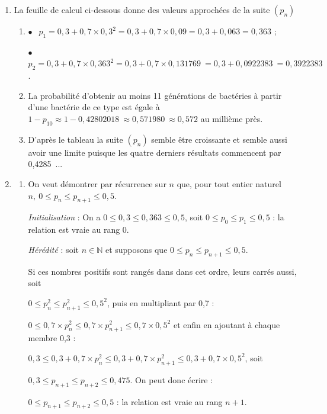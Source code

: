 \documentclass[10pt]{article}
\providecommand{\N}{\mathbb{N}}
\providecommand{\np}[2][]{{#2~#1}}
\begin{document}
\begin{enumerate}
\item La feuille de calcul ci-dessous donne des valeurs approchées de la suite $\left(p_n\right)$
	\begin{enumerate}
		\item 
$\bullet~~$ $p_1 = 0,3 + 0,7 \times 0,3^2 = 0,3 + 0,7 \times 0,09 = 0,3 + 0,063 = 0,363$ ;

$\bullet~~$ $p_2 = 0,3 + 0,7 \times 0,363^2 = 0,3 + 0,7 \times \np{0,131769} = 0,3 + \np{0,0922383} = \np{0,3922383}$.

		\item 
		La probabilité d'obtenir au moins 11 générations de bactéries à partir d'une bactérie de ce type est égale à $1 - p_{10} \approx 1 - \np{0,42802018} \approx \np{0,571980} \approx 0,572$ au millième près.
		
		\item 
D'après le tableau la suite $\left(p_n\right)$ semble être croissante et semble aussi avoir une limite puisque les quatre derniers résultats commencent par \np{0,4285}...
	\end{enumerate}

\item 
	\begin{enumerate}
		\item On veut démontrer par récurrence sur $n$ que, pour tout entier naturel $n,\: 0 \leqslant p_n \leqslant p_{n+1} \leqslant0,5$.
		
\emph{Initialisation}  : On a $0 \leqslant 0,3 \leqslant 0,363 \leqslant 0,5$, soit $0 \leqslant p_0 \leqslant p_1 \leqslant 0,5$ : la relation est vraie au rang 0.

\emph{Hérédité} : soit $n \in \N$ et supposons que $0 \leqslant p_n \leqslant p_{n+1} \leqslant 0,5$.

Si ces nombres positifs sont rangés dans dans cet ordre, leurs carrés aussi, soit 

$0 \leqslant p_n^2 \leqslant p_{n+1}^2 \leqslant 0,5^2$, puis en multipliant par 0,7 :

$0 \leqslant 0,7 \times p_n^2 \leqslant 0,7 \times p_{n+1}^2 \leqslant 0,7 \times 0,5^2$ et enfin en ajoutant à chaque membre 0,3 :

$0,3 \leqslant 0,3 + 0,7 \times p_n^2 \leqslant 0,3 + 0,7 \times p_{n+1}^2 \leqslant 0,3 + 0,7 \times 0,5^2$, soit 

$0,3 \leqslant p_{n+1} \leqslant p_{n+2} \leqslant 0,475$. On peut donc écrire :

$0 \leqslant p_{n+1} \leqslant p_{n+2} \leqslant 0,5$ : la relation est vraie au rang $n + 1$.


\end{enumerate}
\end{enumerate}
\end{document}
